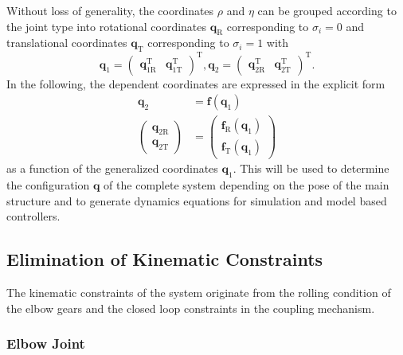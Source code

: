 \documentclass[twocolumn,10pt]{IFTOMM}
\newcommand{\bm}[1]{\boldsymbol{#1}}
\newcommand{\transp}[0]{{\mathrm{T}}}
\begin{document}
Without loss of generality, the coordinates $\rho$ and $\eta$ can be grouped according to the joint type into rotational coordinates $\bm{q}_{\mathrm{R}}$ corresponding to $\sigma_i=0$ and translational coordinates $\bm{q}_{\mathrm{T}}$ corresponding to $\sigma_i=1$ with
%
\begin{equation}
\bm{q}_1=\begin{pmatrix}\bm{q}_{1\mathrm{R}}^\transp & \bm{q}_{1\mathrm{T}}^\transp \end{pmatrix}^\transp,
\bm{q}_2=\begin{pmatrix}\bm{q}_{2\mathrm{R}}^\transp & \bm{q}_{2\mathrm{T}}^\transp \end{pmatrix}^\transp.
\label{equ:q12_sep_transl_rot}
\end{equation}
%
In the following, the dependent coordinates are expressed in the explicit form
%
\begin{align}
\bm{q}_2 &= \bm{f}(\bm{q}_1) \label{equ:kinconstr_explicit}\\
\begin{pmatrix}\bm{q}_{2\mathrm{R}}\\\bm{q}_{2\mathrm{T}}\end{pmatrix} &= \begin{pmatrix}\bm{f}_{\mathrm{R}}(\bm{q}_1)\\\bm{f}_{\mathrm{T}}(\bm{q}_1)\end{pmatrix}
\end{align}
%
as a function of the generalized coordinates $\bm{q}_1$.
This will be used to determine the configuration $\bm{q}$ of the complete system depending on the pose of the main structure and to generate dynamics equations for simulation and model based controllers.

\subsection{Elimination of Kinematic Constraints}
\label{sec:model_elim}

The kinematic constraints of the system originate from the rolling condition of the elbow gears and the closed loop constraints in the coupling mechanism.

\subsubsection{Elbow Joint}
\end{document}

